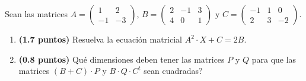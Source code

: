 
Sean las matrices $A=\begin{pmatrix}1&2\\-1&-3\end{pmatrix}$, $B=\begin{pmatrix}2&-1&3\\4&0&1\end{pmatrix}$ y $C=\begin{pmatrix}-1&1&0\\2&3&-2\end{pmatrix}$.
\begin{enumerate}[label=\alph*)]
\item \textbf{(1.7 puntos)} Resuelva la ecuación matricial $A^2\cdot X+C=2B$.
\item \textbf{(0.8 puntos)} \textquestiondown{}Qué dimensiones deben tener las matrices $P$ y $Q$ para que las matrices $(B+C)\cdot P$ y $B\cdot Q\cdot C^t$ sean cuadradas?
\end{enumerate}
